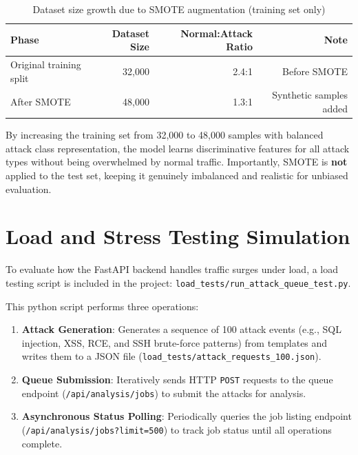 \documentclass[12pt,a4paper]{report}
\begin{document}
\begin{table}[htbp]
  \centering
  \caption{Dataset size growth due to SMOTE augmentation (training set only)}
  \label{tab:smote-augmentation}
  \begin{tabular}{lrrr}
    \toprule
    \textbf{Phase} & \textbf{Dataset Size} & \textbf{Normal:Attack Ratio} & \textbf{Note} \\
    \midrule
    Original training split & 32,000 & 2.4:1 & Before SMOTE \\
    After SMOTE            & 48,000 & 1.3:1 & Synthetic samples added \\
    \bottomrule
  \end{tabular}
\end{table}

By increasing the training set from 32,000 to 48,000 samples with balanced attack class representation, the model learns discriminative features for all attack types without being overwhelmed by normal traffic. Importantly, SMOTE is \textbf{not} applied to the test set, keeping it genuinely imbalanced and realistic for unbiased evaluation.

\section{Load and Stress Testing Simulation}

To evaluate how the FastAPI backend handles traffic surges under load, a load testing script is included in the project: \texttt{load\_tests/run\_attack\_queue\_test.py}.

This python script performs three operations:
\begin{enumerate}[leftmargin=1.5em]
  \item \textbf{Attack Generation}: Generates a sequence of 100 attack events (e.g., SQL injection, XSS, RCE, and SSH brute-force patterns) from templates and writes them to a JSON file (\texttt{load\_tests/attack\_requests\_100.json}).
  \item \textbf{Queue Submission}: Iteratively sends HTTP \texttt{POST} requests to the queue endpoint (\texttt{/api/analysis/jobs}) to submit the attacks for analysis.
  \item \textbf{Asynchronous Status Polling}: Periodically queries the job listing endpoint (\texttt{/api/analysis/jobs?limit=500}) to track job status until all operations complete.
\end{enumerate}
\end{document}
